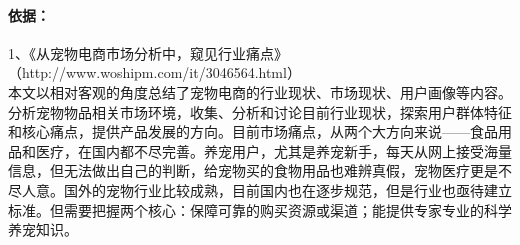 \documentclass[a4paper]{ctexart}
\begin{document}
\begin{enumerate}[label=\alph*.]
  \paragraph{依据：}1、《从宠物电商市场分析中，窥见行业痛点》\\（http://www.woshipm.com/it/3046564.html）\\
  本文以相对客观的角度总结了宠物电商的行业现状、市场现状、用户画像等内容。分析宠物物品相关市场环境，收集、分析和讨论目前行业现状，探索用户群体特征和核心痛点，提供产品发展的方向。目前市场痛点，从两个大方向来说——食品用品和医疗，在国内都不尽完善。养宠用户，尤其是养宠新手，每天从网上接受海量信息，但无法做出自己的判断，给宠物买的食物用品也难辨真假，宠物医疗更是不尽人意。国外的宠物行业比较成熟，目前国内也在逐步规范，但是行业也亟待建立标准。但需要把握两个核心：保障可靠的购买资源或渠道；能提供专家专业的科学养宠知识。
\end{enumerate}
\end{document}
